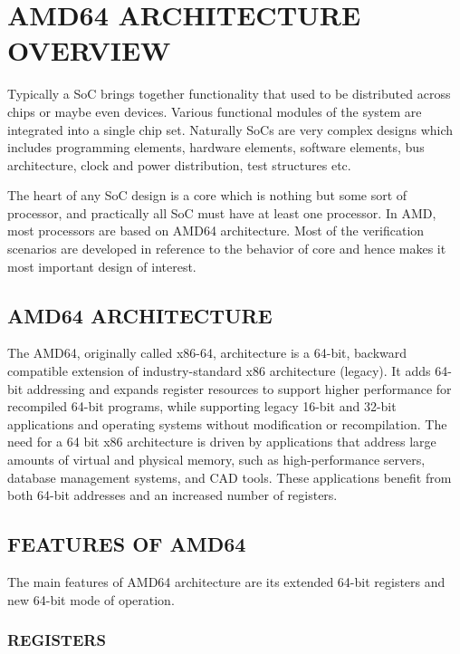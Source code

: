 \chapter{AMD64 ARCHITECTURE OVERVIEW}
\label{chap:amd64}
Typically a SoC brings together functionality that used to be distributed across chips or maybe even devices. Various functional modules of the system are integrated into a single chip set. Naturally SoCs are very complex designs which includes programming elements, hardware elements, software elements, bus architecture, clock and power distribution, test structures etc. 

The heart of any SoC design is a core which is nothing but some sort of processor, and practically all SoC must have at least one processor.  In AMD, most processors are based on AMD64 architecture.  Most of the verification scenarios are developed in reference to the behavior of core and hence makes it most important design of interest.

\section {AMD64 ARCHITECTURE}
The AMD64, originally called x86-64, architecture is a 64-bit, backward compatible extension of industry-standard x86 architecture (legacy)\cite{SS:AMD64-V1}. It adds 64-bit addressing and expands register resources to support higher performance for recompiled 64-bit programs, while supporting legacy 16-bit and 32-bit applications and operating systems without modification or recompilation. The need for a 64 bit x86 architecture is driven by applications that address large amounts of virtual and physical memory, such as high-performance servers, database management systems, and CAD tools. These applications benefit from both 64-bit addresses and an increased number of registers.



\section {FEATURES OF AMD64}
The main features of AMD64 architecture are its extended 64-bit registers and new 64-bit mode of operation.  
\subsection{REGISTERS}

